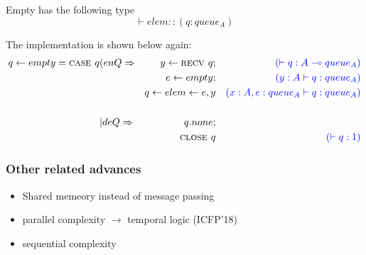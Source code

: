 \documentclass{article}
\begin{document}
		
	Empty has the following type
	\[ \vdash elem :: (q:queue_A) \]

	The implementation is shown below again:
		\begin{align*}
	q \leftarrow empty = \textsc{case } q 
	&(enQ \Rightarrow 
	&y \leftarrow \textsc{recv } q; 
	&& {\color{blue} (\vdash q:A \multimap queue_A)}\\
	&                 &e \leftarrow empty;  
	&& {\color{blue}\qquad (y:A\vdash q:queue_A)}\\
	&                 & q \leftarrow elem \leftarrow e,y
	&& {\color{blue}(x:A,e:queue_A\vdash q:queue_A)}\\[1.5em]
	&| deQ \Rightarrow 
	& q.none; 
	&& \\
	&& \textsc{close }q 
	&& {\color{blue} (\vdash q:1)}
	\end{align*}
	
	
	\subsubsection{Other related advances}
	\begin{itemize}
		\item Shared memeory instead of message passing
		\item parallel complexity $\longrightarrow$ temporal logic (ICFP'18)
		\item sequential complexity
	\end{itemize}
	
	
	
	
	
	
	
	
	
\end{document}
